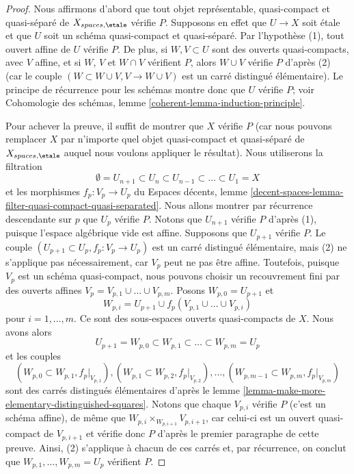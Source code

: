 \begin{proof}
Nous affirmons d'abord que tout objet représentable, quasi-compact et
quasi-séparé de $X_{spaces, \etale}$ v\'erifie $P$.
Supposons en effet que $U \to X$ soit étale et que $U$ soit un schéma
quasi-compact et quasi-séparé. Par l'hypothèse (1), tout ouvert affine de
$U$ v\'erifie $P$. De plus, si $W, V \subset U$ sont des ouverts
quasi-compacts, avec $V$ affine, et si $W$, $V$ et $W \cap V$ v\'erifient
$P$, alors $W \cup V$ v\'erifie $P$ d'après (2)
(car le couple $(W \subset W \cup V, V \to W \cup V)$ est un carré
distingué élémentaire). Le principe de récurrence pour les schémas montre donc
que $U$ v\'erifie $P$; voir
Cohomologie des schémas, lemme \ref{coherent-lemma-induction-principle}.

\medskip\noindent
Pour achever la preuve, il suffit de montrer que $X$ v\'erifie $P$
(car nous pouvons remplacer $X$ par n'importe quel objet quasi-compact et quasi-séparé
de $X_{spaces, \etale}$ auquel nous voulons appliquer le résultat).
Nous utiliserons la filtration
$$
\emptyset = U_{n + 1} \subset
U_n \subset U_{n - 1} \subset \ldots \subset U_1 = X
$$
et les morphismes $f_p : V_p \to U_p$ du
Espaces décents, lemme
\ref{decent-spaces-lemma-filter-quasi-compact-quasi-separated}.
Nous allons montrer par récurrence descendante sur $p$ que $U_p$ v\'erifie
$P$. Notons que $U_{n + 1}$ v\'erifie $P$ d'après (1), puisque l'espace
algébrique vide est affine. Supposons que $U_{p + 1}$ v\'erifie $P$.
Le couple $(U_{p + 1} \subset U_p, f_p : V_p \to U_p)$ est un carré distingué
élémentaire, mais (2) ne s'applique pas nécessairement, car $V_p$ peut ne pas être affine.
Toutefois, puisque $V_p$ est un schéma quasi-compact, nous pouvons choisir un recouvrement
fini par des ouverts affines $V_p = V_{p, 1} \cup \ldots \cup V_{p, m}$.
Posons $W_{p, 0} = U_{p + 1}$ et
$$
W_{p, i} = U_{p + 1} \cup f_p(V_{p, 1} \cup \ldots \cup V_{p, i})
$$
pour $i = 1, \ldots, m$. Ce sont des sous-espaces ouverts quasi-compacts de $X$.
Nous avons alors
$$
U_{p + 1} = W_{p, 0} \subset
W_{p, 1} \subset \ldots \subset
W_{p, m} = U_p
$$
et les couples
$$
(W_{p, 0} \subset W_{p, 1}, f_p|_{V_{p, 1}}),
(W_{p, 1} \subset W_{p, 2}, f_p|_{V_{p, 2}}),\ldots,
(W_{p, m - 1} \subset W_{p, m}, f_p|_{V_{p, m}})
$$
sont des carrés distingués élémentaires d'après le
lemme \ref{lemma-make-more-elementary-distinguished-squares}.
Notons que chaque $V_{p, i}$ v\'erifie $P$ (c'est un schéma affine), de même
que $W_{p, i} \times_{W_{p, i + 1}} V_{p, i + 1}$, car celui-ci est un ouvert
quasi-compact de $V_{p, i + 1}$ et vérifie donc $P$ d'après le premier
paragraphe de cette preuve. Ainsi, (2) s'applique à chacun de ces carrés et,
par récurrence, on conclut que
$W_{p, 1}, \ldots, W_{p, m} = U_p$ vérifient $P$.
\end{proof}


